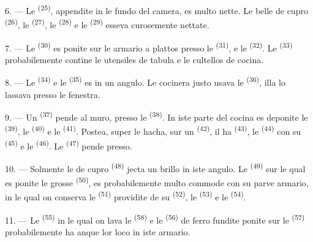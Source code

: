 \VUsaut{4.0mm}
\VUsaut{3.0mm}

6. --- Le  \textsuperscript{(25)}, appendite in le
fundo del camera, es multo nette. Le belle  de cupro
\textsuperscript{(26)}, le  \textsuperscript{(27)}, le
 \textsuperscript{(28)} e le 
\textsuperscript{(29)} esseva curosemente nettate.

7. --- Le  \textsuperscript{(30)} es ponite sur le armario a
plattos presso le  \textsuperscript{(31)}, e le  \textsuperscript{(32)}. Le 
\textsuperscript{(33)} probabilemente contine le utensiles de tabula e le
cultellos de cocina.

8. --- Le  \textsuperscript{(34)} e le 
\textsuperscript{(35)} es in un angulo. Le cocinera justo usava le  \textsuperscript{(36)}, illa lo lassava presso le fenestra.

9. --- Un  \textsuperscript{(37)} pende al muro, presso
le  \textsuperscript{(38)}. In iste parte del cocina es
deponite le  \textsuperscript{(39)}, le 
\textsuperscript{(40)} e le  \textsuperscript{(41)}.
Postea, super le hacha, sur un  \textsuperscript{(42)}, il ha
 \textsuperscript{(43)}, le 
\textsuperscript{(44)} con su  \textsuperscript{(45)} e le
 \textsuperscript{(46)}. Le 
\textsuperscript{(47)} pende presso.

10. --- Solmente le  de cupro \textsuperscript{(48)} jecta un
brillo in iste angulo. Le  \textsuperscript{(49)} sur le qual
es ponite le grosse  \textsuperscript{(50)}, es probabilemente
multo commode con su parve armario, in le qual on conserva le  \textsuperscript{(51)} providite de su 
\textsuperscript{(52)}, le  \textsuperscript{(53)} e
le  \textsuperscript{(54)}.

\VUsaut{4.0mm}
\VUsaut{3.0mm}

11. --- Le  \textsuperscript{(55)} in le qual on lava le
 \textsuperscript{(58)} e le 
\textsuperscript{(56)} de ferro fundite ponite sur le 
\textsuperscript{(57)} probabilemente ha anque lor loco in iste armario.

